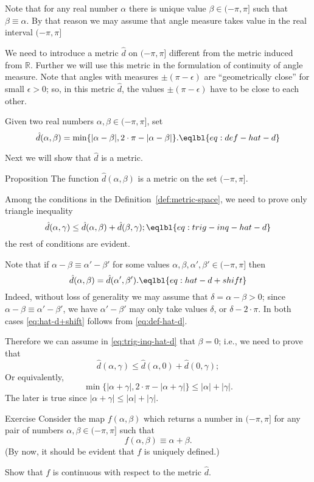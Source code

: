 Note that for any real number $\alpha$ there is unique value $\beta\in(-\pi,\pi]$ such that
$\beta\equiv \alpha$.
By that reason we may assume that angle measure takes value in the real interval $(-\pi,\pi]$

We need to introduce a metric $\hat{d}$ on $(-\pi,\pi]$
different from the metric induced from $\mathbb{R}$.
Further we will use this metric in the formulation 
of continuity of angle measure.
Note that angles with measures $\pm(\pi-\epsilon)$ are ``geometrically close'' for small $\epsilon>0$;
so, in this metric $\hat{d}$, the values $\pm(\pi-\epsilon)$ have to be close to each other.

Given two real numbers 
$\alpha,\beta\in (-\pi,\pi]$,
set \label{def:max-dist}
$$\hat{d}(\alpha,\beta)
=
\min\{|\alpha-\beta|,2\cdot\pi-|\alpha-\beta|\}.
\eqlbl{eq:def-hat-d}
$$

Next we will show that $\hat{d}$ is a metric.

\begin{thm}{Proposition}
The function $\hat{d}(\alpha,\beta)$ is a metric on the set $(-\pi,\pi]$.
\end{thm}

Among the conditions in the Definition~\ref{def:metric-space}, we need to prove only triangle inequality
$$\hat{d}(\alpha,\gamma)\le \hat{d}(\alpha,\beta)+\hat{d}(\beta,\gamma);
\eqlbl{eq:trig-inq-hat-d}$$
the rest of conditions are  evident.

Note that if $\alpha-\beta\equiv \alpha'-\beta'$
for some values 
$\alpha,\beta,\alpha',\beta'\in (-\pi,\pi]$
then 
$$\hat{d}(\alpha,\beta)
=
\hat{d}(\alpha',\beta').
\eqlbl{eq:hat-d+shift}$$
Indeed, without loss of generality we may assume that $\delta=\alpha-\beta>0$;
since $\alpha-\beta\equiv \alpha'-\beta'$,
we have $\alpha'-\beta'$ may only take  values $\delta$, or $\delta-2\cdot\pi $.
In both cases \ref{eq:hat-d+shift} follows from \ref{eq:def-hat-d}.

Therefore we can assume in \ref{eq:trig-inq-hat-d}
that $\beta=0$;
i.e., we need to prove that
$$\hat{d}(\alpha,\gamma)
\le 
\hat{d}(\alpha,0)+\hat{d}(0,\gamma);
$$
Or equivalently,
$$\min\{|\alpha+\gamma|,2\cdot\pi-|\alpha+\gamma|\}\le |\alpha|+|\gamma|.$$
The later is true since 
$|\alpha+\gamma|\le |\alpha|+|\gamma|$.
\qeds

\begin{thm}{Exercise}\label{ex:hat-d-and-+}
Consider the map 
$f(\alpha,\beta)$ which returns a number in $(-\pi,\pi]$ for any pair of numbers $\alpha,\beta\in (-\pi,\pi]$
such that 
$$f(\alpha,\beta)\equiv \alpha+\beta.$$
(By now, it should be evident that $f$ is uniquely defined.)

Show that $f$ is continuous with respect to the metric $\hat d$.
\end{thm}











